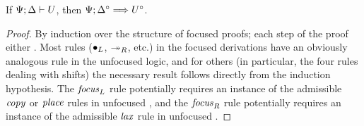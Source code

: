 \bigskip
\begin{theorem}
If ${\Psi};{\Delta} \vdash {U}$, then $\Psi; \Delta^\circ \Longrightarrow U^\circ$.
\end{theorem}

\begin{proof}
  By induction over the structure of focused proofs; each step of the
  proof either . Most rules (${\mathbin{\bullet}}_L$, $\twoheadrightarrow_R$, etc.) in the
  focused derivations have an obviously analogous rule in the unfocused
  logic, and for others (in particular, the four rules dealing with shifts)
  the necessary result follows directly from the induction hypothesis. 
  The ${\it focus}_L$ rule potentially requires an instance of the
  admissible ${\it copy}$ or ${\it place}$ rules in unfocused \ollll, and
  the ${\it focus}_R$ rule potentially requires an instance of the
  admissible ${\it lax}$ rule in unfocused \ollll.
\end{proof}

